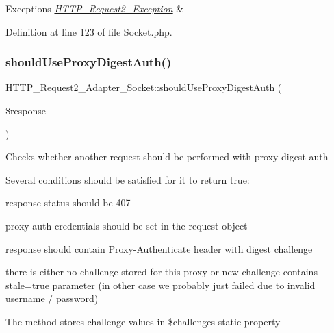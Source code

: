 \begin{DoxyExceptions}{Exceptions}
{\em \hyperlink{classHTTP__Request2__Exception}{H\+T\+T\+P\+\_\+\+Request2\+\_\+\+Exception}} & \\
\hline
\end{DoxyExceptions}


Definition at line 123 of file Socket.\+php.

\mbox{\label{classHTTP__Request2__Adapter__Socket_af26e1fe3de20a109ff76fbadab10ec28}} 
\subsubsection{\texorpdfstring{should\+Use\+Proxy\+Digest\+Auth()}{shouldUseProxyDigestAuth()}}
{\footnotesize\ttfamily H\+T\+T\+P\+\_\+\+Request2\+\_\+\+Adapter\+\_\+\+Socket\+::should\+Use\+Proxy\+Digest\+Auth (\begin{DoxyParamCaption}\item[{\hyperlink{classHTTP__Request2__Response}{H\+T\+T\+P\+\_\+\+Request2\+\_\+\+Response}}]{\$response }\end{DoxyParamCaption})\hspace{0.3cm}{\ttfamily [protected]}}

Checks whether another request should be performed with proxy digest auth

Several conditions should be satisfied for it to return true\+:
\begin{DoxyItemize}
\item response status should be 407
\item proxy auth credentials should be set in the request object
\item response should contain Proxy-\/\+Authenticate header with digest challenge
\item there is either no challenge stored for this proxy or new challenge contains stale=true parameter (in other case we probably just failed due to invalid username / password)
\end{DoxyItemize}

The method stores challenge values in \$challenges static property


